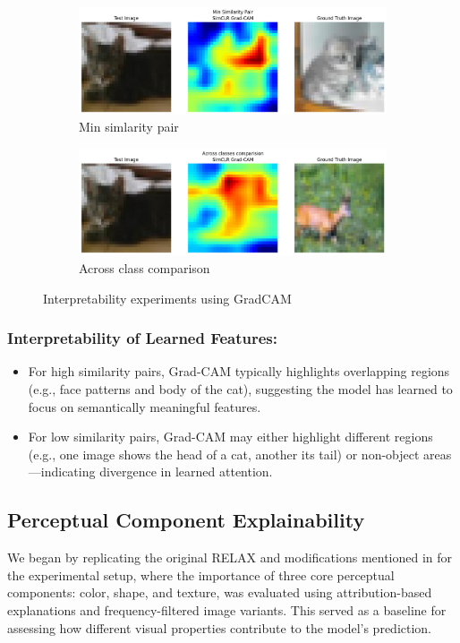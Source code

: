\begin{figure}[h]
\begin{subfigure}{\linewidth}
        \includegraphics[width=\linewidth]{images/gc4.jpeg}
        \caption{Min simlarity pair }
        \label{fig:gc4}
    \end{subfigure}\vspace{10pt}
    \begin{subfigure}{\linewidth}
        \includegraphics[width=\linewidth]{images/gc5.jpeg}
        \caption{Across class comparison}
        \label{fig:gc5}
    \end{subfigure}
    \caption{Interpretability experiments using GradCAM}
    \label{fig:gc_plots}
\end{figure}

\subsubsection{Interpretability of Learned Features:}
\begin{itemize}
    \item For high similarity pairs, Grad-CAM typically highlights overlapping regions (e.g., face patterns and body of the cat), suggesting the model has learned to focus on semantically meaningful features.
    \item For low similarity pairs, Grad-CAM may either highlight different regions (e.g., one image shows the head of a cat, another its tail) or non-object areas—indicating divergence in learned attention.
\end{itemize}


\subsection{Perceptual Component Explainability}
We began by replicating the original RELAX and modifications mentioned in \cite{yarici2024explaining} for the experimental setup, where the importance of three core perceptual components: color, shape, and texture, was evaluated using attribution-based explanations and frequency-filtered image variants.
This served as a baseline for assessing how different visual properties contribute to the model’s prediction.

